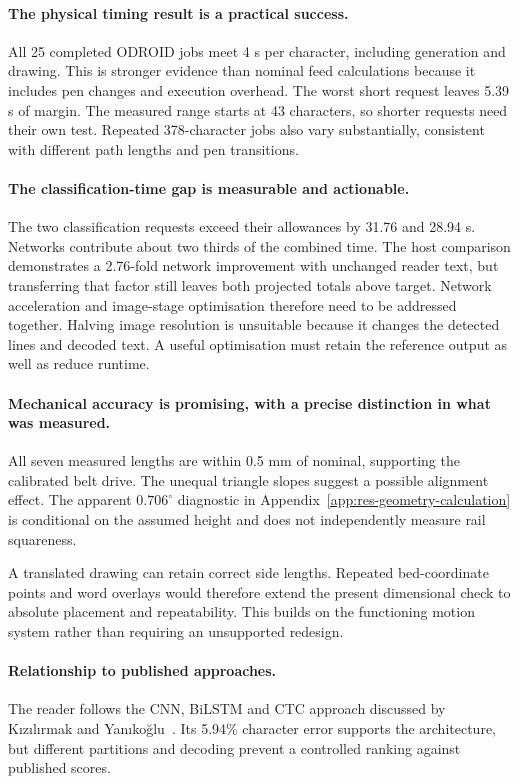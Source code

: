 \paragraph{The physical timing result is a practical success.}
All 25 completed ODROID jobs meet 4 s per character, including generation and drawing. This is stronger evidence than nominal feed calculations because it includes pen changes and execution overhead. The worst short request leaves 5.39 s of margin. The measured range starts at 43 characters, so shorter requests need their own test. Repeated 378-character jobs also vary substantially, consistent with different path lengths and pen transitions.

\paragraph{The classification-time gap is measurable and actionable.}
The two classification requests exceed their allowances by 31.76 and 28.94 s. Networks contribute about two thirds of the combined time. The host comparison demonstrates a 2.76-fold network improvement with unchanged reader text, but transferring that factor still leaves both projected totals above target. Network acceleration and image-stage optimisation therefore need to be addressed together. Halving image resolution is unsuitable because it changes the detected lines and decoded text. A useful optimisation must retain the reference output as well as reduce runtime.

\paragraph{Mechanical accuracy is promising, with a precise distinction in what was measured.}
All seven measured lengths are within 0.5 mm of nominal, supporting the calibrated belt drive. The unequal triangle slopes suggest a possible alignment effect. The apparent $0.706^\circ$ diagnostic in Appendix~\ref{app:res-geometry-calculation} is conditional on the assumed height and does not independently measure rail squareness.

A translated drawing can retain correct side lengths. Repeated bed-coordinate points and word overlays would therefore extend the present dimensional check to absolute placement and repeatability. This builds on the functioning motion system rather than requiring an unsupported redesign.

\paragraph{Relationship to published approaches.}
The reader follows the CNN, BiLSTM and CTC approach discussed by K{\i}z{\i}l{\i}rmak and Yan{\i}ko{\u g}lu~\cite[pp.~4--5]{kizilirmak2023}. Its 5.94\% character error supports the architecture, but different partitions and decoding prevent a controlled ranking against published scores.

